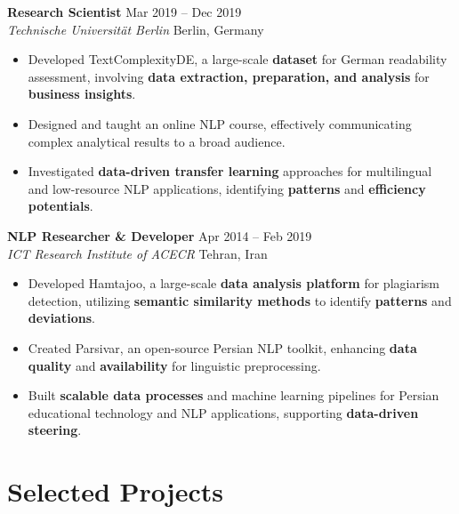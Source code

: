\documentclass[11pt,a4paper]{article}
\newcommand{\cvitem}[1]{
    \item #1
}
\newcommand{\role}[4]{
    \textbf{#1} \hfill {\small #2} \\
    \textit{#3} \hfill {\small #4}
}
\begin{document}
\vspace{0.5em}

\role
{Research Scientist}
{Mar 2019 -- Dec 2019}
{Technische Universität Berlin}
{Berlin, Germany}

\begin{itemize}
    \cvitem{Developed TextComplexityDE, a large-scale \textbf{dataset} for German readability assessment, involving \textbf{data extraction, preparation, and analysis} for \textbf{business insights}.}

    \cvitem{Designed and taught an online NLP course, effectively communicating complex analytical results to a broad audience.}

    \cvitem{Investigated \textbf{data-driven transfer learning} approaches for multilingual and low-resource NLP applications, identifying \textbf{patterns} and \textbf{efficiency potentials}.}
\end{itemize}


\vspace{0.5em}


\begin{samepage}

\role
{NLP Researcher \& Developer}
{Apr 2014 -- Feb 2019}
{ICT Research Institute of ACECR}
{Tehran, Iran}

\begin{itemize}
    \cvitem{Developed Hamtajoo, a large-scale \textbf{data analysis platform} for plagiarism detection, utilizing \textbf{semantic similarity methods} to identify \textbf{patterns} and \textbf{deviations}.}

    \cvitem{Created Parsivar, an open-source Persian NLP toolkit, enhancing \textbf{data quality} and \textbf{availability} for linguistic preprocessing.}

    \cvitem{Built \textbf{scalable data processes} and machine learning pipelines for Persian educational technology and NLP applications, supporting \textbf{data-driven steering}.}
\end{itemize}
\end{samepage}

\vspace{0.7em}

\section*{Selected Projects}
\end{document}
